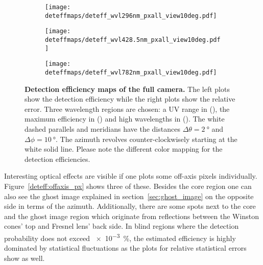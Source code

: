 \begin{figure}[H]
	\centering
	\begin{subfigure}[t]{0.705\textwidth}
		\texttt{[image: deteffmaps/deteff\_wvl296nm\_pxall\_view10deg.pdf]}
		\label{deteff:full_cam:1}
	\end{subfigure}
	\hfill
	\begin{subfigure}[t]{0.705\textwidth}
		\texttt{[image: deteffmaps/deteff\_wvl428.5nm\_pxall\_view10deg.pdf]}
		\label{deteff:full_cam:2}
	\end{subfigure}
	\vfill
	\begin{subfigure}[t]{0.705\textwidth}
		\texttt{[image: deteffmaps/deteff\_wvl782nm\_pxall\_view10deg.pdf]}
		\label{deteff:full_cam:3}
	\end{subfigure}
	\caption[Detection efficiency maps of the full camera]{\textbf{Detection efficiency maps of the full camera.} The left plots show the detection efficiency while the right plots show the relative error. Three wavelength regions are chosen: a UV range in (), the maximum efficiency in () and high wavelengths in (). The white dashed parallels and meridians have the distances $\Delta\theta=\SI{2}{\degree}$ and $\Delta\phi=\SI{10}{\degree}$. The azimuth revolves counter-clockwisely starting at the white solid line. Please note the different color mapping for the detection efficiencies.}
	\label{deteff:full_cam}		
\end{figure}

Interesting optical effects are visible if one plots some off-axis pixels individually. Figure~\ref{deteff:offaxis_px} shows three of these. Besides the core region one can also see the ghost image explained in section~\ref{sec:ghost_image} on the opposite side in terms of the azimuth. Additionally, there are some spots next to the core and the ghost image region which originate from reflections between the Winston cones' top and Fresnel lens' back side. In blind regions where the detection probability does not exceed \SI{e-3}{\percent}, the estimated efficiency is highly dominated by statistical fluctuations as the plots for relative statistical errors show as well.\\

